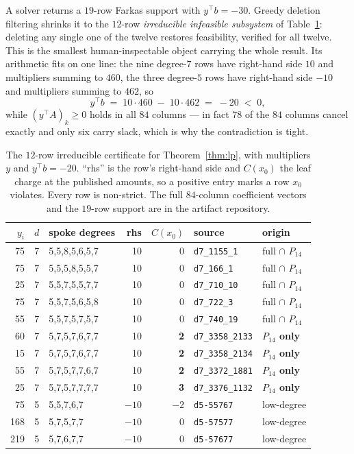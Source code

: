 \documentclass[11pt]{article}
\theoremstyle{definition}
\begin{document}
A solver returns a $19$-row Farkas support with $y^\top b = -30$. Greedy deletion
filtering shrinks it to the $12$-row \emph{irreducible infeasible subsystem} of
Table~\ref{tab:cert}: deleting any single one of the twelve restores
feasibility, verified for all twelve. This is the smallest human-inspectable
object carrying the whole result. Its arithmetic fits on one line: the nine
degree-$7$ rows have right-hand side $10$ and multipliers summing to $460$, the
three degree-$5$ rows have right-hand side $-10$ and multipliers summing to
$462$, so
\[
  y^\top b \;=\; 10\cdot 460 \;-\; 10\cdot 462 \;=\; -20 \;<\; 0 ,
\]
while $(y^\top\! A)_k \ge 0$ holds in all $84$ columns --- in fact $78$ of the
$84$ columns cancel exactly and only six carry slack, which is why the
contradiction is tight.

\begin{table}[t]
\centering\small
\caption{The $12$-row irreducible certificate for Theorem~\ref{thm:lp}, with
multipliers $y$ and $y^\top b = -20$. ``rhs'' is the row's right-hand side and
$C(x_0)$ the leaf charge at the published amounts, so a positive entry marks a
row $x_0$ violates. Every row is non-strict. The full $84$-column coefficient
vectors and the $19$-row support are in the artifact repository.}
\label{tab:cert}
\begin{tabular}{rrlrrll}
\toprule
$y_i$ & $d$ & spoke degrees & rhs & $C(x_0)$ & source & origin \\
\midrule
75  & 7 & 5,5,8,5,6,5,7 & 10 & 0 & \texttt{d7\_1155\_1} & full $\cap$ $P_{14}$ \\
75  & 7 & 5,5,5,8,5,5,7 & 10 & 0 & \texttt{d7\_166\_1}  & full $\cap$ $P_{14}$ \\
25  & 7 & 5,5,7,5,5,7,7 & 10 & 0 & \texttt{d7\_710\_10} & full $\cap$ $P_{14}$ \\
75  & 7 & 5,5,7,5,6,5,8 & 10 & 0 & \texttt{d7\_722\_3}  & full $\cap$ $P_{14}$ \\
55  & 7 & 5,5,7,5,7,5,7 & 10 & 0 & \texttt{d7\_740\_19} & full $\cap$ $P_{14}$ \\
60  & 7 & 5,7,5,7,6,7,7 & 10 & \textbf{2} & \texttt{d7\_3358\_2133} & \textbf{$P_{14}$ only} \\
15  & 7 & 5,7,5,7,6,7,7 & 10 & \textbf{2} & \texttt{d7\_3358\_2134} & \textbf{$P_{14}$ only} \\
55  & 7 & 5,7,5,7,7,6,7 & 10 & \textbf{2} & \texttt{d7\_3372\_1881} & \textbf{$P_{14}$ only} \\
25  & 7 & 5,7,5,7,7,7,7 & 10 & \textbf{3} & \texttt{d7\_3376\_1132} & \textbf{$P_{14}$ only} \\
75  & 5 & 5,5,7,6,7     & $-10$ & $-2$ & \texttt{d5-55767} & low-degree \\
168 & 5 & 5,7,5,7,7     & $-10$ & 0    & \texttt{d5-57577} & low-degree \\
219 & 5 & 5,7,6,7,7     & $-10$ & 0    & \texttt{d5-57677} & low-degree \\
\bottomrule
\end{tabular}
\end{table}
\end{document}
